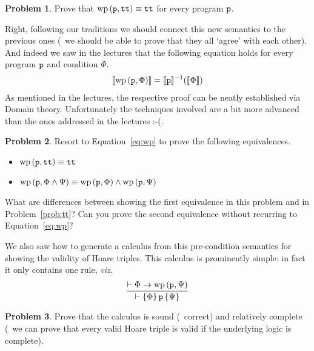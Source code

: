 \documentclass[a4paper, 11pt]{article}
\theoremstyle{definition}
\newtheorem{problem}{Problem}
\begin{document}
\begin{problem}
        \label{prob:tt}
  Prove that $\mathrm{wp} \, (\mathtt{p}, \mathtt{tt}) \equiv \mathtt{tt}$ for every
  program $\mathtt{p}$.
\end{problem}

Right, following our traditions we should connect this new semantics to the
previous ones (\ie\ we should be able to prove that they all `agree' with each
other). And indeed we saw in the lectures that the following equation holds for
every program $\mathtt{p}$ and condition $\Phi$.
\begin{align}
        \label{eq:wp}
        \llbracket \mathrm{wp} \, (\mathtt{p}, \Phi) \rrbracket = \llbracket \mathtt{p} \rrbracket^{-1}(\llbracket \Phi \rrbracket)
\end{align}
As mentioned in the lectures, the respective proof can be neatly established
via Domain theory. Unfortunately the techniques involved are a bit more
advanced than the ones addressed in the lectures :-(.

\begin{problem}
        Resort to Equation~\eqref{eq:wp} to prove the following equivalences.
    \begin{itemize}
                \item $\mathrm{wp} \, (\mathtt{p}, \mathtt{tt}) \equiv \mathtt{tt}$
                \item $\mathrm{wp} \, (\mathtt{p}, \Phi \wedge \Psi )
                \equiv \mathrm{wp} \, (\mathtt{p}, \Phi) \wedge 
                \mathrm{wp} \, (\mathtt{p}, \Psi )$
   \end{itemize}
   What are differences between showing the first equivalence in this problem
   and in Problem~\eqref{prob:tt}? Can you prove the second equivalence without
   recurring to Equation~\eqref{eq:wp}?
\end{problem}

We also saw how to generate a calculus from this pre-condition semantics for
showing the validity of Hoare triples. This calculus is prominently simple: in
fact it only contains one rule, \emph{viz.}
\[
                \infer{\vdash \{ \Phi \} \, \prog{p} \, \{ \Psi \}}
                { \vdash \Phi \rightarrow \mathrm{wp} \, (\prog{p}, \Psi) }
\]

\begin{problem}
        Prove that the calculus is sound (\ie\ correct) and relatively complete
        (\ie\ we can prove that every valid Hoare triple is valid if the underlying
        logic is complete).
\end{problem}
\end{document}
